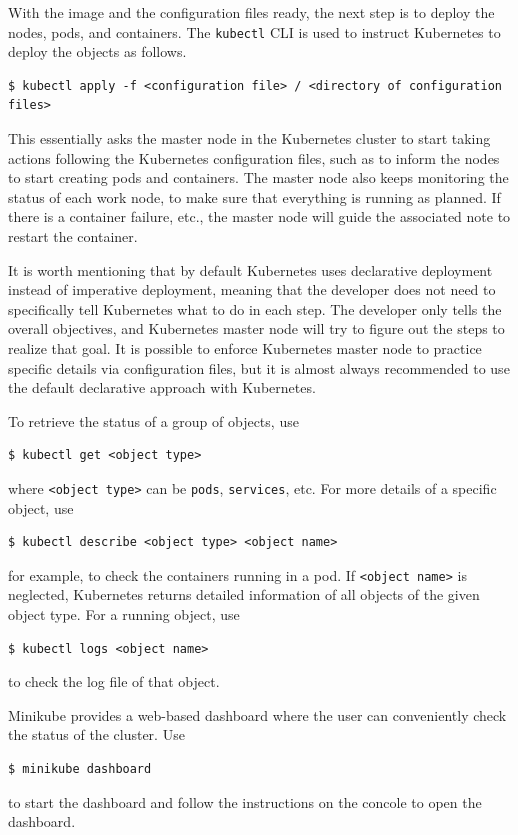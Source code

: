 With the image and the configuration files ready, the next step is to deploy the nodes, pods, and containers. The \verb|kubectl| CLI is used to instruct Kubernetes to deploy the objects as follows.
\begin{lstlisting}
$ kubectl apply -f <configuration file> / <directory of configuration files>
\end{lstlisting}
This essentially asks the master node in the Kubernetes cluster to start taking actions following the Kubernetes configuration files, such as to inform the nodes to start creating pods and containers. The master node also keeps monitoring the status of each work node, to make sure that everything is running as planned. If there is a container failure, etc., the master node will guide the associated note to restart the container.

It is worth mentioning that by default Kubernetes uses declarative deployment instead of imperative deployment, meaning that the developer does not need to specifically tell Kubernetes what to do in each step. The developer only tells the overall objectives, and Kubernetes master node will try to figure out the steps to realize that goal. It is possible to enforce Kubernetes master node to practice specific details via configuration files, but it is almost always recommended to use the default declarative approach with Kubernetes.

To retrieve the status of a group of objects, use
\begin{lstlisting}
$ kubectl get <object type>
\end{lstlisting}
where \verb|<object type>| can be \verb|pods|, \verb|services|, etc. For more details of a specific object, use
\begin{lstlisting}
$ kubectl describe <object type> <object name>
\end{lstlisting}
for example, to check the containers running in a pod. If \verb|<object name>| is neglected, Kubernetes returns detailed information of all objects of the given object type. For a running object, use
\begin{lstlisting}
$ kubectl logs <object name>
\end{lstlisting}
to check the log file of that object.

Minikube provides a web-based dashboard where the user can conveniently check the status of the cluster. Use
\begin{lstlisting}
$ minikube dashboard
\end{lstlisting} 
to start the dashboard and follow the instructions on the concole to open the dashboard.

